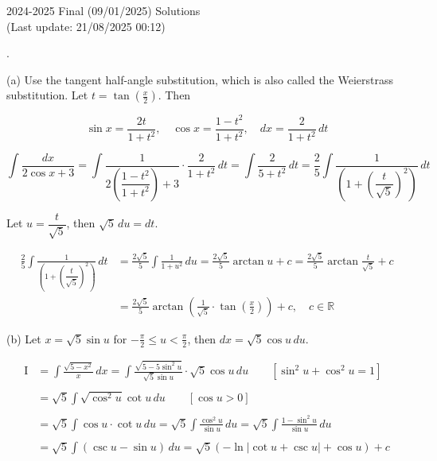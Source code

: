 \documentclass{article}
\begin{document}
\newpage

\begin{center}
2024-2025 Final (09/01/2025) Solutions\\
(Last update: 21/08/2025 00:12)
\end{center}

.

\hfill

\noindent (a) Use the tangent half-angle substitution, which is also called the Weierstrass substitution. Let $\displaystyle t = \tan\left(\frac x2\right)$. Then

\[\sin x={\frac{2t}{1+t^{2}}},\quad\cos x={\frac{1-t^{2}}{1+t^{2}}},\quad dx={\frac2{1+t^{2}}}\,dt\]

\[\int\frac{dx}{2\cos x+3}=\int\frac1{2\left(\dfrac{1-t^2}{1+t^2}\right)+3}\cdot\frac2{1+t^2}\,dt=\int\frac2{5+t^2}\,dt=\frac25\int\frac1{\left(1+\left(\dfrac t{\sqrt5}\right)^2\right)}\,dt\]

\hfill

\noindent Let $u=\dfrac t{\sqrt5}$, then $\sqrt5\,du=dt$.

\begin{align*}\frac25\int\frac1{\left(1+\left(\dfrac t{\sqrt5}\right)^2\right)}\,dt&=\frac{2\sqrt5}5\int\frac1{1+u^2}\,du=\frac{2\sqrt5}5\arctan u+c=\frac{2\sqrt5}5\arctan\frac t{\sqrt5}+c\\&=\boxed{\frac{2\sqrt5}5\arctan\left(\frac1{\sqrt5}\cdot\tan\left(\frac x2\right)\right)+c,\quad c\in\mathbb{R}}\end{align*}

\hfill

\hfill

\noindent (b) Let $\displaystyle x=\sqrt5\sin u$ for $\displaystyle-\frac\pi2\leq u<\frac\pi2$, then $dx=\displaystyle\sqrt5\cos u\,du$.

\begin{align*}\mathrm{I}&=\int\frac{\sqrt{5-x^2}}{x}\,dx=\int\frac{\sqrt{5-5\sin^2u}}{\sqrt5\sin u}\cdot\sqrt5\cos u\,du\qquad\left[\sin^2u+\cos^2u=1\right]\\\\&=\sqrt5\int\sqrt{\cos^2u}\cot u\,du\qquad\left[\cos u>0\right]\\\\&=\sqrt5\int\cos u\cdot\cot u\,du=\sqrt5\int\frac{\cos^2u}{\sin u}\,du=\sqrt5\int\frac{1-\sin^2u}{\sin u}\,du\\\\&=\sqrt5\int\left(\csc u-\sin u\right)\,du=\sqrt5\left(-\ln\left|\cot u+\csc u\right|+\cos u\right)+c\end{align*}
\end{document}
